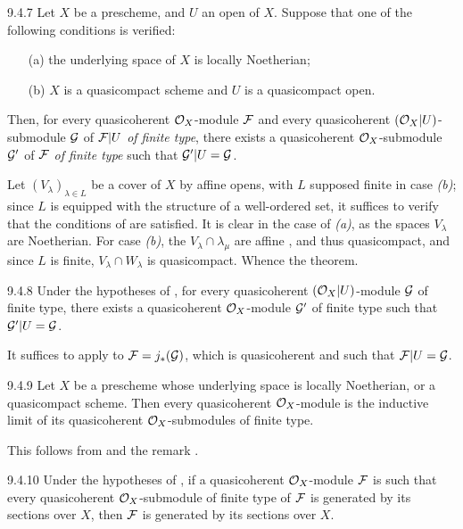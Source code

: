 \documentclass[../main.tex]{subfiles}
\begin{document}
\begin{env}[Theorem]{9.4.7}
Let $X$ be a prescheme, and $U$ an open of $X$.
Suppose that one of the following conditions is verified:
\begin{itemize}
  \item[(a)] the underlying space of $X$ is locally Noetherian;
  \item[(b)] $X$ is a quasicompact scheme and $U$ is a quasicompact open.
\end{itemize}
Then, for every quasicoherent $\mathcal{O}_X$-module $\mathcal{F}$ and every quasicoherent
$(\mathcal{O}_X|U)$-submodule $\mathcal{G}$ of $\mathcal{F}|U$ \emph{of finite type}, there exists a
quasicoherent $\mathcal{O}_X$-submodule $\mathcal{G}'$ of $\mathcal{F}$ \emph{of finite type}
such that $\mathcal{G}'|U=\mathcal{G}$.
\end{env}

Let $(V_\lambda)_{\lambda\in L}$ be a cover of $X$ by affine opens,
with $L$ supposed finite in case \emph{(b)}; since $L$ is equipped with the
structure of a well-ordered set, it suffices to verify that the conditions of
 are satisfied. It is clear in the case of \emph{(a)}, as the spaces
$V_\lambda$ are Noetherian. For case \emph{(b)}, the $V_\lambda\cap\lambda_\mu$
are affine , and thus quasicompact, and since $L$ is finite,
$V_\lambda\cap W_\lambda$ is quasicompact. Whence the theorem.

\begin{env}[Corollary]{9.4.8}
Under the hypotheses of , for every
quasicoherent $(\mathcal{O}_X|U)$-module $\mathcal{G}$ of finite type, there exists a
quasicoherent $\mathcal{O}_X$-module $\mathcal{G}'$ of finite type such that
$\mathcal{G}'|U=\mathcal{G}$.
\end{env}

It suffices to apply  to $\mathcal{F}=j_\ast(\mathcal{G})$, which is
quasicoherent  and such that $\mathcal{F}|U=\mathcal{G}$.

\begin{env}[Corollary]{9.4.9}
Let $X$ be a prescheme whose underlying space is
locally Noetherian, or a quasicompact scheme.  Then every quasicoherent
$\mathcal{O}_X$-module is the inductive limit of its quasicoherent $\mathcal{O}_X$-submodules of
finite type.
\end{env}

This follows from  and the remark .

\begin{env}[Corollary]{9.4.10}
Under the hypotheses of , if a
quasicoherent $\mathcal{O}_X$-module $\mathcal{F}$ is such that every quasicoherent
$\mathcal{O}_X$-submodule of finite type of $\mathcal{F}$ is generated by its sections
over $X$, then $\mathcal{F}$ is generated by its sections over $X$.
\end{env}
\end{document}
